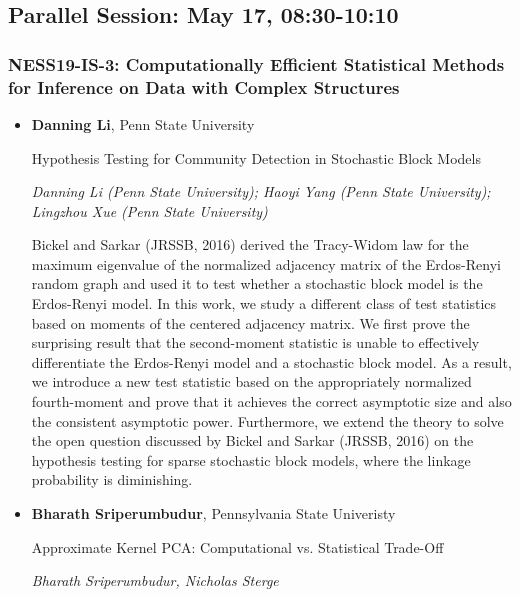 \subsection*{Parallel Session: May 17, 08:30-10:10}

\subsubsection*{NESS19-IS-3: Computationally Efficient Statistical Methods for Inference on Data with Complex Structures}

\begin{itemize}
\item \textbf{Danning Li}, Penn State University

Hypothesis Testing for Community Detection in Stochastic Block Models

\emph{\footnotesize Danning Li (Penn State University); Haoyi Yang (Penn State University); Lingzhou Xue  (Penn State University)}

Bickel and Sarkar (JRSSB, 2016) derived the Tracy-Widom law for the maximum eigenvalue of the normalized adjacency matrix of the Erdos-Renyi random graph and used it to test whether a stochastic block model is the Erdos-Renyi model. In this work, we study a different class of test statistics based on moments of the centered adjacency matrix. We first prove the surprising result that the second-moment statistic is unable to effectively differentiate the Erdos-Renyi model and a stochastic block model. As a result, we introduce a new test statistic based on the appropriately normalized fourth-moment and prove that it achieves the correct asymptotic size and also the consistent asymptotic power. Furthermore, we extend the theory to solve the open question discussed by Bickel and Sarkar (JRSSB, 2016) on the hypothesis testing for sparse stochastic block models, where the linkage probability is diminishing.

\item \textbf{Bharath Sriperumbudur}, Pennsylvania State Univeristy

Approximate Kernel PCA: Computational vs. Statistical Trade-Off

\emph{\footnotesize Bharath Sriperumbudur, Nicholas Sterge}


\end{itemize}

